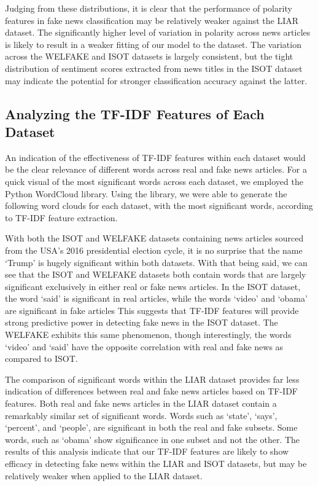 \documentclass[twocolumn,10pt]{article}
\begin{document}
Judging from these distributions, it is clear that the performance of polarity features in fake news classification may be relatively weaker against the LIAR dataset. The significantly higher level of variation in polarity across news articles is likely to result in a weaker fitting of our model to the dataset. The variation across the WELFAKE and ISOT datasets is largely consistent, but the tight distribution of sentiment scores extracted from news titles in the ISOT dataset may indicate the potential for stronger classification accuracy against the latter.

\subsection{Analyzing the TF-IDF Features of Each Dataset}
An indication of the effectiveness of TF-IDF features within each dataset would be the clear relevance of different words across real and fake news articles. For a quick visual of the most significant words across each dataset, we employed the Python WordCloud \cite{11} library. Using the library, we were able to generate the following word clouds for each dataset, with the most significant words, according to TF-IDF feature extraction.

With both the ISOT and WELFAKE datasets containing news articles sourced from the USA’s 2016 presidential election cycle, it is no surprise that the name ‘Trump’ is hugely significant within both datasets. With that being said, we can see that the ISOT and WELFAKE datasets both contain words that are largely significant exclusively in either real or fake news articles. In the ISOT dataset, the word ‘said’ is significant in real articles, while the words ‘video’ and ‘obama’ are significant in fake articles This suggests that TF-IDF features will provide strong predictive power in detecting fake news in the ISOT dataset. The WELFAKE exhibits this same phenomenon, though interestingly, the words ‘video’ and ‘said’ have the opposite correlation with real and fake news as compared to ISOT.

The comparison of significant words within the LIAR dataset provides far less indication of differences between real and fake news articles based on TF-IDF features. Both real and fake news articles in the LIAR dataset contain a remarkably similar set of significant words. Words such as ‘state’, ‘says’, ‘percent’, and ‘people’, are significant in both the real and fake subsets. Some words, such as ‘obama’ show significance in one subset and not the other. The results of this analysis indicate that our TF-IDF features are likely to show efficacy in detecting fake news within the LIAR and ISOT datasets, but may be relatively weaker when applied to the LIAR dataset.
\end{document}
